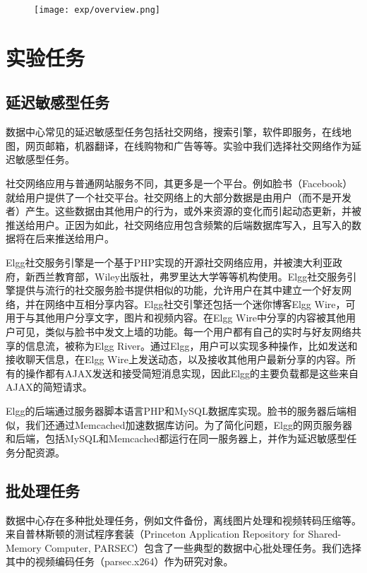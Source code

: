 \begin{figure}
  \centering
    \centering
    \texttt{[image: exp/overview.png]}
    \label{fig:overview}    
\end{figure}


\section{实验任务}
\subsection{延迟敏感型任务}
数据中心常见的延迟敏感型任务包括社交网络，搜索引擎，软件即服务，在线地图，网页邮箱，机器翻译，在线购物和广告等等。实验中我们选择社交网络作为延迟敏感型任务。

社交网络应用与普通网站服务不同，其更多是一个平台。例如脸书（Facebook）就给用户提供了一个社交平台。社交网络上的大部分数据是由用户（而不是开发者）产生。这些数据由其他用户的行为，或外来资源的变化而引起动态更新，并被推送给用户。正因为如此，社交网络应用包含频繁的后端数据库写入，且写入的数据将在后来推送给用户。

Elgg社交服务引擎是一个基于PHP实现的开源社交网络应用，并被澳大利亚政府，新西兰教育部，Wiley出版社，弗罗里达大学等等机构使用\cite{palit2016demystifying}。Elgg社交服务引擎提供与流行的社交服务脸书提供相似的功能，允许用户在其中建立一个好友网络，并在网络中互相分享内容。Elgg社交引擎还包括一个迷你博客Elgg Wire，可用于与其他用户分享文字，图片和视频内容。在Elgg Wire中分享的内容被其他用户可见，类似与脸书中发文上墙的功能。每一个用户都有自己的实时与好友网络共享的信息流，被称为Elgg River。通过Elgg，用户可以实现多种操作，比如发送和接收聊天信息，在Elgg Wire上发送动态，以及接收其他用户最新分享的内容。所有的操作都有AJAX发送和接受简短消息实现，因此Elgg的主要负载都是这些来自AJAX的简短请求。

Elgg的后端通过服务器脚本语言PHP和MySQL数据库实现。脸书的服务器后端相似\cite{nishtala2013scaling}，我们还通过Memcached加速数据库访问。为了简化问题，Elgg的网页服务器和后端，包括MySQL和Memcached都运行在同一服务器上，并作为延迟敏感型任务分配资源。

\subsection{批处理任务}
数据中心存在多种批处理任务，例如文件备份，离线图片处理和视频转码压缩等。来自普林斯顿的测试程序套装（Princeton Application Repository for Shared-Memory Computer, PARSEC）\cite{bienia11benchmarking}包含了一些典型的数据中心批处理任务。我们选择其中的视频编码任务（parsec.x264）作为研究对象。

